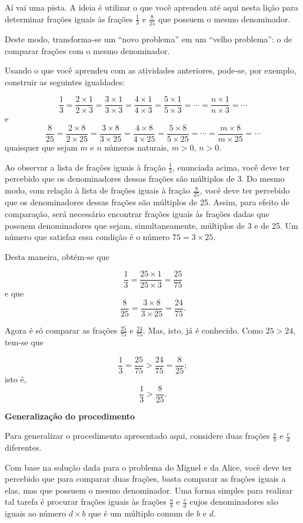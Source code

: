 Aí vai uma pista.  A ideia é utilizar o que você aprendeu até aqui nesta lição para determinar frações iguais às frações $\frac{1}{3}$ e $\frac{8}{25}$ que possuem o mesmo denominador.

Deste modo, transforma-se um ``novo problema'' em um ``velho problema'': o de comparar frações com o mesmo denominador.

Usando o que você aprendeu com as atividades anteriores, pode-se, por exemplo, construir as seguintes igualdades:

$$\dfrac{1}{3} = \dfrac{2 \times 1}{2 \times 3} = \dfrac{3 \times 1}{3 \times 3} = \dfrac{4 \times 1}{4 \times 3} = \dfrac{5 \times 1}{5 \times 3} = \cdots = \dfrac{n \times 1}{n\times 3} = \cdots$$
e
$$\dfrac{8}{25} = \dfrac{2 \times 8}{2 \times 25} = \dfrac{3 \times 8}{3 \times 25} = \dfrac{4 \times 8}{4 \times 25} = \dfrac{5 \times 8}{5 \times 25} = \cdots = \dfrac{m \times 8}{m\times 25} = \cdots$$
quaisquer que sejam $m$ e $n$ números naturais, $m > 0$, $n > 0$.

Ao observar a lista de frações iguais à fração $\frac{1}{3}$, enunciada acima, você deve ter percebido que os denominadores dessas frações são múltiplos de 3.  Do mesmo modo, com relação à lista de frações iguais à fração $\frac{8}{25}$, você deve ter percebido que os denominadores dessas frações são múltiplos de 25. Assim, para efeito de comparação, será necessário encontrar frações iguais às frações dadas que possuem denominadores que sejam, simultaneamente, múltiplos de 3 e de 25. Um número que satisfaz essa condição é o número $75 = 3 \times 25$.

Desta maneira, obtém-se que

$$\dfrac{1}{3} = \dfrac{25 \times 1}{25 \times 3} = \dfrac{25}{75}$$
e que
$$\dfrac{8}{25} = \dfrac{3 \times 8}{3 \times 25} = \dfrac{24}{75}.$$

Agora é só comparar as frações $\frac{25}{75}$ e $\frac{24}{75}$. Mas, isto, já é conhecido.
Como $25 > 24$, tem-se que

$$\dfrac{1}{3} = \dfrac{25}{75} > \dfrac{24}{75} =  \dfrac{8}{25};$$
isto é,
$$\dfrac{1}{3} > \dfrac{8}{25}.$$

{\bf Generalização do procedimento}

Para generalizar o procedimento apresentado aqui, considere duas frações $\frac{a}{b}$ e $\frac{c}{d}$ diferentes.

Com base na solução dada para o problema do Miguel e da Alice, você deve ter percebido que para comparar duas frações, basta comparar as frações iguais a elas, mas que possuem o mesmo denominador. Uma forma simples para realizar tal tarefa é procurar frações iguais às frações  $\frac{a}{b}$ e $\frac{c}{d}$ cujos denominadores são iguais ao número $d\times b$ que é um múltiplo comum de $b$ e $d$.

